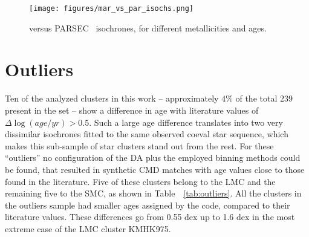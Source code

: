 \documentclass{aa}
\begin{document}
\begin{appendix}
\begin{figure*}
\texttt{[image: figures/mar\_vs\_par\_isochs.png]}
\caption{\cite{Marigo_2008} versus PARSEC~\citep{Bressan_2012} isochrones, for
different metallicities and ages.}
\label{fig:marig_parsec}
\end{figure*}





\section{Outliers}
\label{apdx:outliers}

Ten of the analyzed clusters in this work -- approximately $4\%$ of the total
239 present in the set -- show a difference in age with literature
values of $\Delta\log(age/yr){>}0.5$.
Such a large age difference translates into two very dissimilar isochrones
fitted to the same observed coeval star sequence, which makes this sub-sample of
star clusters stand out from the rest.
%
For these ``outliers'' no configuration of the DA plus the employed binning
methods could be found, that resulted in synthetic CMD matches with age values
close to those found in the literature.
%
Five of these clusters belong to the LMC and the remaining five to the SMC,
as shown in Table~~\ref{tab:outliers}.
All the clusters in the outliers sample had smaller ages assigned by the code,
compared to their literature values. These differences go from 0.55
dex up to 1.6 dex in the most extreme case of the LMC cluster KMHK975.


\end{appendix}
\end{document}
